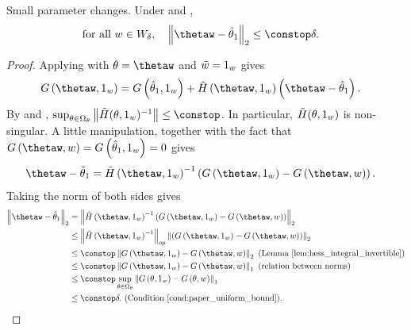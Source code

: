 \begin{lem}
\label{lem:theta_difference_bound}Small parameter changes. Under
\globalassum and ,
\begin{align*}
\textrm{for all }w\in W_{\delta},\quad\norm{{{\thetaw}}-\thetaone}_{2} &
    \le\constop\delta.
\end{align*}
\end{lem}
%
\begin{proof}
%
Applying  with $\theta = \thetaw$
and $\tilde{w} = 1_{w}$ gives
%
%
\begin{align*}
G\left(\thetaw,\onevec\right) &
    =G\left(\thetaone,\onevec\right) +
    \hint\left(\thetaw, \onevec\right)
    \left(\thetaw-\thetaone\right).
\end{align*}
%
By  and
,
$\sup_{\theta \in \Omega_\theta}
\norm{\hint(\theta,\onevec)^{-1}} \le \constop$.
%
In particular, $\tilde{H}(\theta,1_{w})$ is non-singular.
A little manipulation, together with the fact that
$G\left(\thetaw,w\right)=G\left(\thetaone,\onevec\right)=0$ gives
%
\begin{align*}
\thetaw-\thetaone & =
    \hint\left(\thetaw,\onevec\right)^{-1}
    \left(G\left(\thetaw, \onevec\right) - G\left(\thetaw,w\right)\right).
\end{align*}
%
Taking the norm of both sides gives
%
\begin{align*}
\norm{{{\thetaw}}-\thetaone}_{2} & =
    \norm{\hint\left(\thetaw,\onevec\right)^{-1}
        \left(G\left({{\thetaw}},\onevec\right) -
             G\left({{\thetaw}},w\right)\right)}_{2}\\
& \le\norm{\hint\left(\thetaw,\onevec\right)^{-1}}_{op}
    \norm{\left(G\left({{\thetaw}},\onevec\right) -
                G\left({{\thetaw}},w\right)\right)}_{2}\\
& \le\constop\norm{G\left({{\thetaw}},\onevec\right) -
                   G\left({{\thetaw}},w\right)}_{2}
    \textrm{ (Lemma \ref{lem:hess_integral_invertible})}\\
& \le\constop\norm{
    G\left({{\thetaw}},\onevec\right) -
    G\left({{\thetaw}},w\right)}_{1}\textrm{ (relation between norms)}\\
& \le\constop\sup_{\theta\in\Omega_{\theta}}
    \norm{G\left(\theta,\onevec\right)-G\left(\theta,w\right)}_{1}\\
& \le\constop\delta.\textrm{ (Condition \ref{cond:paper_uniform_bound}).}
%
\end{align*}
%
\end{proof}

